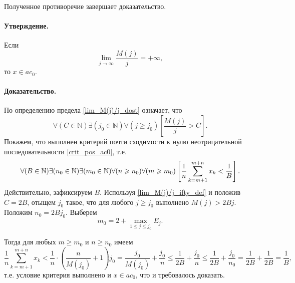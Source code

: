 \documentclass[a4paper,12pt,openbib]{report}
\begin{document}
Полученное противоречие завершает доказательство.


\paragraph{Утверждение.}
Если
\begin{equation}\label{lim_M(j)/j_dost}
	\lim_{j \to \infty} \frac{M(j)}{j} = +\infty
	,
\end{equation}
то $x \in ac_0$.

\paragraph{Доказательство.}

По определению предела \eqref{lim_M(j)/j_dost} означает, что
\begin{equation}\label{lim_M(j)/j_ifty_def}
	\forall(C  \in\mathbb{N})
	\exists(j_0\in\mathbb{N})
	\forall(j \geq j_0)
	\left[
		\frac{M(j)}{j}>C
	\right]
	.
\end{equation}
Покажем, что выполнен критерий почти сходимости к нулю неотрицательной последовательности
\eqref{crit_pos_ac0}, т.е.
\begin{equation}
	\forall(B  \in\mathbb{N})
	\exists(n_0\in\mathbb{N})
	\exists(m_0\in\mathbb{N})
	\forall(n\geq n_0)
	\forall(m\geq m_0)
	\\
	\left[
		\frac{1}{n}
		\sum_{k=m+1}^{m+n} x_k
		<
		\frac{1}{B}
	\right]
	.
\end{equation} Действительно, зафиксируем $B$.
Используя \eqref{lim_M(j)/j_ifty_def} и положив $C=2B$,
отыщем $j_0$ такое, что для любого $j\geq j_0$ выполнено
$M(j)>2Bj$.
Положим $n_0 = 2Bj_0$.
Выберем
$$
	m_0 = 2+\max_{1\leq j \leq j_0} E_j
	.
$$

Тогда для любых $m\geq m_0$ и $n\geq n_0$ имеем
\begin{equation}
	\frac{1}{n} \sum_{k=m+1}^{m+n} x_k
	<
	\frac{1}{n} \cdot \left( \frac{n}{M(j_0)} + 1 \right) j_0
	=
	\frac{j_0}{M(j_0)} + \frac{j_0}{n}
	\leq
	\frac{1}{2B} + \frac{j_0}{n}
	\leq
	\frac{1}{2B} + \frac{j_0}{n_0}
	=
	\frac{1}{2B} + \frac{1}{2B}
	=
	\frac{1}{B}
	,
\end{equation}
т.е. условие критерия выполнено
и $x\in ac_0$,
что и требовалось доказать.
\end{document}
